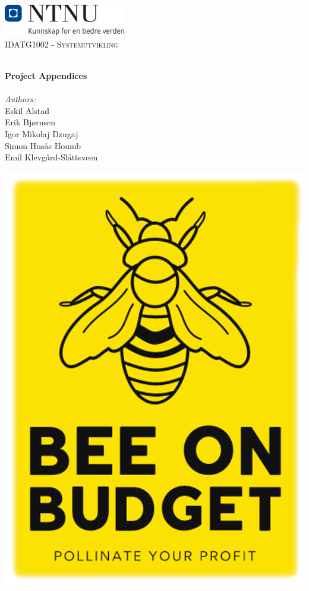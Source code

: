 
\begin{titlepage}
\vbox{ }
\vbox{ }
\begin{center}
\includegraphics[width=0.40\textwidth]{Images/NTNU_logo.png}\\[1cm]
\textsc{\Large IDATG1002 - Systemutvikling}\\[0.5cm]
\vbox{ }

\HRule \\[0.4cm]
{ \huge \bfseries Project Appendices}\\[0.4cm]
\HRule \\[1.5cm]

\large
\emph{Authors:}\\
Eskil Alstad\\ 
Erik Bjørnsen\\
Igor Mikolaj Dzugaj\\
Simon Husås Houmb\\
Emil Klevgård-Slåttsveen\\


\vfill

\begin{center}
\includegraphics[scale=0.5]{Project Appendices/image.png}
\end{center}


\end{center}
\end{titlepage}

